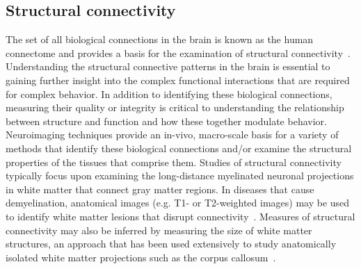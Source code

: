 \documentclass[final,authoryear,5p,times,twocolumn]{elsarticle}
\begin{document}
\subsection{Structural connectivity}
The set of all biological connections in the brain is known as the human connectome and provides a basis for the examination of structural connectivity~\cite{Sporns2005}. Understanding the structural connective patterns in the brain is essential to gaining further insight into the complex functional interactions that are required for complex behavior. In addition to identifying these biological connections, measuring their quality or integrity is critical to understanding the relationship between structure and function and how these together modulate behavior.  Neuroimaging techniques provide an in-vivo, macro-scale basis for a variety of methods that identify these biological connections and/or examine the structural properties of the tissues that comprise them. Studies of structural connectivity typically focus upon examining the long-distance myelinated neuronal projections in white matter that connect gray matter regions. In diseases that cause demyelination, anatomical images (e.g. T1- or T2-weighted images) may be used to identify white matter lesions that disrupt connectivity~\cite{Loevblad2010}. Measures of structural connectivity may also be inferred by measuring the size of white matter structures, an approach that has been used extensively to study anatomically isolated white matter projections such as the corpus callosum~\cite{Witelson1989,Colcombe2005a,Gunning-Dixon2000}. 
\end{document}
